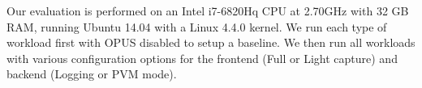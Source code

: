 \documentclass[withindex,glossary]{cam-thesis}
\begin{document}
Our evaluation is performed on an Intel i7-6820Hq CPU at 2.70GHz with 32 GB RAM, running Ubuntu 14.04 with a Linux 4.4.0 kernel.
We run each type of workload first with OPUS disabled to setup a baseline.
We then run all workloads with various configuration options for the frontend (Full or Light capture) and backend (Logging or PVM mode).











\end{document}

